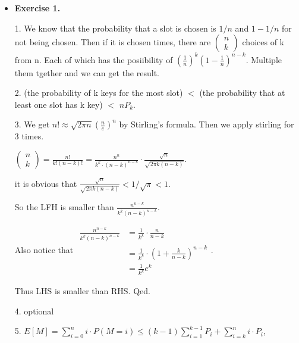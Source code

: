 \documentclass{article}
\begin{document}
\noindent

\noindent{}

\begin{itemize}

\item \textbf{Exercise 1.}

1. We know that the probability that a slot is chosen is $1/n$ and $1-1/n$ for not being chosen. Then if it is chosen times, there are $\left(\begin{array}{l}n \\ k\end{array}\right)$ choices of k from n. Each of which has the posiibility of $\left(\frac{1}{n}\right)^{k}\left(1-\frac{1}{n}\right)^{n-k}$. Multiple them tgether and we can get the result. 

2. (the probability of k keys for the most slot) $<$ (the probability that at least one slot has k key) $<$ $nP_k$.

3. We get $n ! \approx \sqrt{2 \pi n}\left(\frac{n}{e}\right)^{n}$ by Stirling's formula. Then we apply stirling for 3 times.

$\left(\begin{array}{l}n \\ k\end{array}\right)=\frac{n !}{k !(n-k) !}=\frac{n^{n}}{k^{k} \cdot(n-k)^{n-k}} \cdot \frac{\sqrt{n}}{\sqrt{2 \pi k (n-k)} }$.

it is obvious that $\frac{\sqrt{n}}{\sqrt{2 \pi k (n-k)} } < 1/\sqrt{\pi} < 1$. 

So the LFH is smaller than $\frac{n^{n-k}}{k^{k}(n-k)^{n-k}}$. 

Also notice that $\begin{aligned} \frac{n^{n-k}}{k^{k}(n-k)^{n-k}} &=\frac{1}{k^{k}} \cdot \frac{n}{n-k} \\ &=\frac{1}{k^{k}} \cdot\left(1+\frac{k}{n-k}\right)^{n-k} \\  &=\frac{1}{k^{k}} e^{k} \end{aligned}$. 

Thus LHS is smaller than RHS. Qed.

4. optional

5. $E[M]=\sum_{i=0}^{n} i \cdot P(M=i) \le(k-1) \sum_{i=1}^{k-1} P_{i}+ \sum_{i=k}^{n} i \cdot P_{i}$,


\end{itemize}
\end{document}
